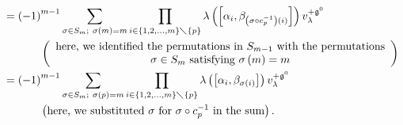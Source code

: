 \documentclass[etingof-lie.tex]{subfiles}
\begin{document}
\begin{align*}
&  =\left(  -1\right)  ^{m-1}\sum\limits_{\sigma\in S_{m};\ \sigma\left(
m\right)  =m}\prod\limits_{i\in\left\{  1,2,...,m\right\}  \diagdown\left\{
p\right\}  }\lambda\left(  \left[  \alpha_{i},\beta_{\left(  \sigma\circ
c_{p}^{-1}\right)  \left(  i\right)  }\right]  \right)  v_{\lambda
}^{+\mathfrak{g}^{0}}\\
&  \ \ \ \ \ \ \ \ \ \ \left(
\begin{array}
[c]{c}%
\text{here, we identified the permutations in }S_{m-1}\text{ with the
permutations}\\
\sigma\in S_{m}\text{ satisfying }\sigma\left(  m\right)  =m
\end{array}
\right) \\
&  =\left(  -1\right)  ^{m-1}\sum\limits_{\sigma\in S_{m};\ \sigma\left(
p\right)  =m}\prod\limits_{i\in\left\{  1,2,...,m\right\}  \diagdown\left\{
p\right\}  }\lambda\left(  \left[  \alpha_{i},\beta_{\sigma\left(  i\right)
}\right]  \right)  v_{\lambda}^{+\mathfrak{g}^{0}}\\
&  \ \ \ \ \ \ \ \ \ \ \left(  \text{here, we substituted }\sigma\text{ for
}\sigma\circ c_{p}^{-1}\text{ in the sum}\right)  .
\end{align*}
\end{document}
